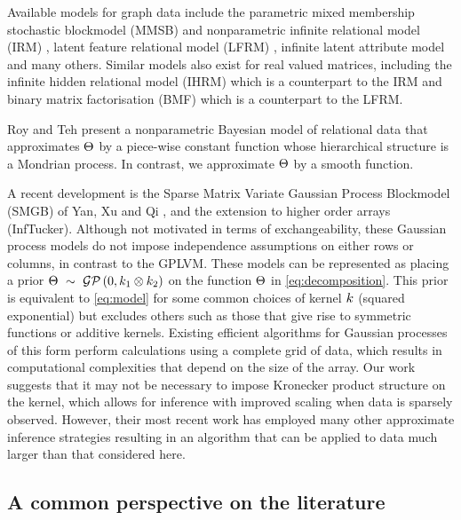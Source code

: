 Available models for graph data include the parametric mixed membership stochastic blockmodel (MMSB) \citep{Airoldi2008-fr} and nonparametric infinite relational model (IRM) \cite{Kemp2006-jt}, latent feature relational model (LFRM) \cite{Miller2009-wg}, infinite latent attribute model \cite{Palla2012-ch} and many others.
Similar models also exist for real valued matrices, including the infinite hidden relational model (IHRM) \citep{Xu2006-uy} which is a counterpart to the IRM and binary matrix factorisation (BMF) \citep{Meeds2007-gd} which is a counterpart to the LFRM.

Roy and Teh \citep{Roy2009-ge} present a nonparametric Bayesian model of relational data that approximates $\Theta$ by a piece-wise constant function whose hierarchical structure is a Mondrian process. In contrast, we approximate $\Theta$ by a smooth function.

A recent development is the Sparse Matrix Variate Gaussian Process Blockmodel (SMGB) of Yan, Xu and Qi \cite{Yan2011-lc}, and the extension to higher order arrays \cite{Xu2012-ub} (InfTucker).
Although not motivated in terms of exchangeability, these Gaussian process models do not impose independence assumptions on either rows or columns, in contrast to the GPLVM.
These models can be represented as placing a prior ${\Theta \ \sim\  \mathcal{GP}\,(0, k_1 \otimes k_2)}$ on the function $\Theta$ in \eqref{eq:decomposition}.
This prior is equivalent to \eqref{eq:model} for some common choices of kernel $k$ (\eg squared exponential) but excludes others such as those that give rise to symmetric functions or additive kernels.
Existing efficient algorithms for Gaussian processes of this form \citep[e.g.][]{Saatci2011-yo} perform calculations using a complete grid of data, which results in computational complexities that depend on the size of the array.
Our work suggests that it may not be necessary to impose Kronecker product structure on the kernel, which allows for inference with improved scaling when data is sparsely observed.
However, their most recent work \citep{Zhe2013-tv} has employed many other approximate inference strategies resulting in an algorithm that can be applied to data much larger than that considered here.

\subsection{A common perspective on the literature}

